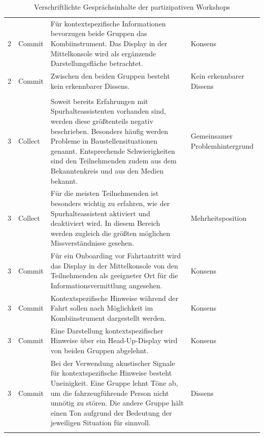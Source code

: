 {\begin{xltabular}{\textwidth}{
    P{1.25cm}
    P{1.35cm}
    Y
    P{2.3cm}
}
\rowrule

2 &
Commit &
Für kontextspezifische Informationen bevorzugen beide Gruppen das Kombiinstrument. Das Display in der Mittelkonsole wird als ergänzende Darstellungsfläche betrachtet. &
Konsens
\\

\rowrule

2 &
Commit &
Zwischen den beiden Gruppen besteht kein erkennbarer Dissens. &
Kein erkennbarer Dissens
\\

\rowrule
{}
\\

\rowrule

3 &
Collect &
Soweit bereits Erfahrungen mit Spurhalteassistenten vorhanden sind, werden diese größtenteils negativ beschrieben. Besonders häufig werden Probleme in Baustellensituationen genannt. Entsprechende Schwierigkeiten sind den Teilnehmenden zudem aus dem Bekanntenkreis und aus den Medien bekannt. &
Gemeinsamer Problemhintergrund
\\

\rowrule

3 &
Collect &
Für die meisten Teilnehmenden ist besonders wichtig zu erfahren, wie der Spurhalteassistent aktiviert und deaktiviert wird. In diesem Bereich werden zugleich die größten möglichen Missverständnisse gesehen. &
Mehrheitsposition
\\

\rowrule

3 &
Commit &
Für ein Onboarding vor Fahrtantritt wird das Display in der Mittelkonsole von den Teilnehmenden als geeigneter Ort für die Informationsvermittlung angesehen. &
Konsens
\\

\rowrule

3 &
Commit &
Kontextspezifische Hinweise während der Fahrt sollen nach Möglichkeit im Kombiinstrument dargestellt werden. &
Konsens
\\

\rowrule

3 &
Commit &
Eine Darstellung kontextspezifischer Hinweise über ein Head-Up-Display wird von beiden Gruppen abgelehnt. &
Konsens
\\

\rowrule

3 &
Commit &
Bei der Verwendung akustischer Signale für kontextspezifische Hinweise besteht Uneinigkeit. Eine Gruppe lehnt Töne ab, um die fahrzeugführende Person nicht unnötig zu stören. Die andere Gruppe hält einen Ton aufgrund der Bedeutung der jeweiligen Situation für sinnvoll. &
Dissens
\\*

\bottomrule

\caption{Verschriftlichte Gesprächsinhalte der partizipativen Workshops}
\label{tab:verbalisierte_praeferenzen_workshops}
\\

\end{xltabular}

}

